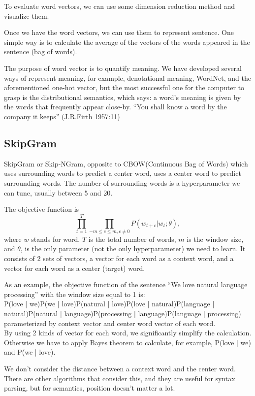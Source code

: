 \documentclass{report}
\begin{document}
To evaluate word vectors, we can use some dimension reduction method and visualize them.

Once we have the word vectors, we can use them to represent sentence. One simple way is to calculate the average of the vectors of the words appeared in the sentence (bag of words).

The purpose of word vector is to quantify meaning. We have developed several ways of represent meaning, for example, denotational meaning, WordNet, and the aforementioned one-hot vector, but the most successful one for the computer to grasp is the distributional semantics, which says: a word's meaning is given by the words that frequently appear close-by.
{\center
``You shall know a word by the company it keeps'' (J.R.Firth 1957:11)}


\subsection{SkipGram}
SkipGram or Skip-NGram, opposite to CBOW(Continuous Bag of Words) which uses surrounding words to predict a center word, uses a center word to predict surrounding words. The number of surrounding words is a hyperparameter we can tune, usually between 5 and 20.

The objective function is \[
\prod_{t=1}^{T} \prod_{-m\le c \le m, c\neq 0} P(w_{t + c} | w_t; \theta)   
,\] 
where $w$ stands for word, $T$ is the total number of words, $m$ is the window size, and $\theta$, is the only parameter (not the only hyperparameter) we need to learn. It consists of 2 sets of vectors, a vector for each word as a context word, and a vector for each word as a center (target) word. 

As an example, the objective function of the sentence ``We love natural language processing'' with the window size equal to 1 is:\\ 
	P(love | we)P(we | love)P(natural | love)P(love | natural)P(language | natural)P(natural | language)P(processing | language)P(language | processing) parameterized by context vector and center word vector of each word. \\
	By using 2 kinds of vector for each word, we significantly simplify the calculation. Otherwise we have to apply Bayes theorem to calculate, for example, P(love | we) and P(we | love). 

	We don't consider the distance between a context word and the center word. There are other algorithms that consider this, and they are useful for syntax parsing, but for semantics, position doesn't matter a lot.
\end{document}
